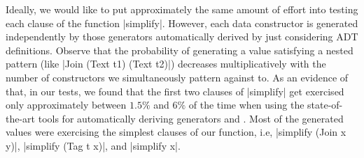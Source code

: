 Ideally, we would like to put approximately the same amount of effort into
testing each clause of the function |simplify|.
%
However, each data constructor is generated independently by those generators
automatically derived by just considering ADT definitions.
Observe that the probability of generating a value satisfying a nested pattern
(like |Join (Text t1) (Text t2)|) decreases multiplicatively with the number of
constructors we simultaneously pattern against to.
%
As an evidence of that, in our tests, we found that the first two clauses of
|simplify| get exercised only approximately between $1.5\%$ and $6\%$ of the
time when using the state-of-the-art tools for automatically deriving
\quickcheck generators \megadeth \cite{GriecoCB16} and {\dragen}
\cite{DBLP:conf/haskell/MistaRH18}.
%
Most of the generated values were exercising the simplest clauses of our
function, i.e, |simplify (Join x y)|, |simplify (Tag t x)|, and |simplify x|.






